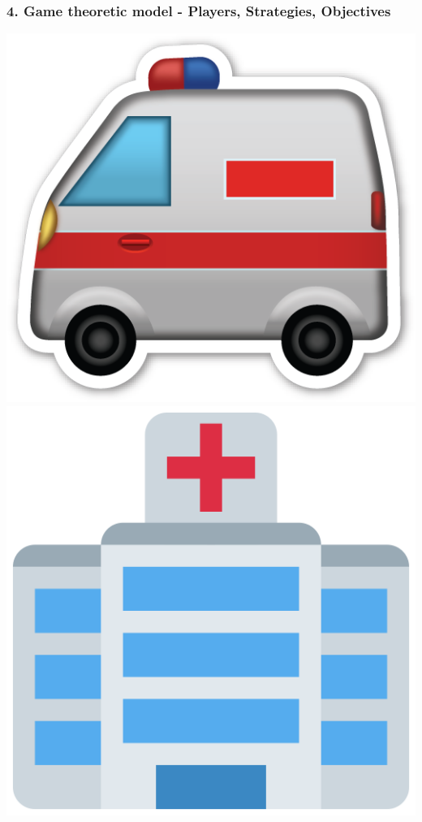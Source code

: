 \begin{frame}
    \frametitle{4. Game theoretic model - Players, Strategies, Objectives}
    \centering

    \includegraphics[scale=0.1]{Bin/game_avatars/ambulance_cartoon.png}
    \hspace{2cm}
    \includegraphics[scale=0.1]{Bin/game_avatars/hospital.png}

\end{frame}
